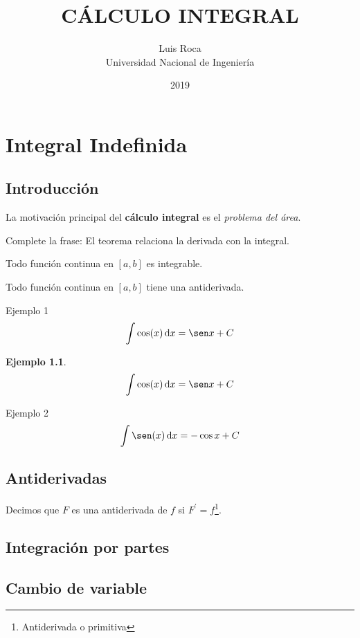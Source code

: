 \documentclass[11pt,a4paper]{book}
\title{CÁLCULO INTEGRAL}
\author{Luis Roca \\ 
Universidad Nacional de Ingeniería}
\date{2019}
\newtheorem{ejemplo}{Ejemplo}
\begin{document}
\frontmatter
\maketitle
\tableofcontents
\mainmatter
\chapter{Integral Indefinida}
\section*{Introducción}
La motivación principal del \textbf{cálculo integral} es el \textit{problema del área}.

Complete la frase: El teorema \underline{\hspace{5cm}} relaciona la derivada con la integral.

\begin{flushright}
Todo función continua en $[a,b]$ es integrable. 
\end{flushright} 
\begin{center}
Todo función continua en $[a,b]$ tiene una antiderivada. 
\end{center}

\hrulefill Ejemplo 1 \hrulefill
\[
\int \cos(x)\, {\rm d}x=\sen x + C
\]
 \begin{ejemplo}
 \[
\int \cos(x)\, {\rm d}x=\sen x + C
\]
 \end{ejemplo}
\dotfill Ejemplo 2 \dotfill
\[
\int \sen(x)\, {\rm d}x=- \cos x + C
\]
\section{Antiderivadas}
Decimos que $F$ es una antiderivada de $f$ si $F^\prime=f$\footnote{Antiderivada o primitiva}.





\section{Integración por partes}
\section{Cambio de variable}
\end{document}
